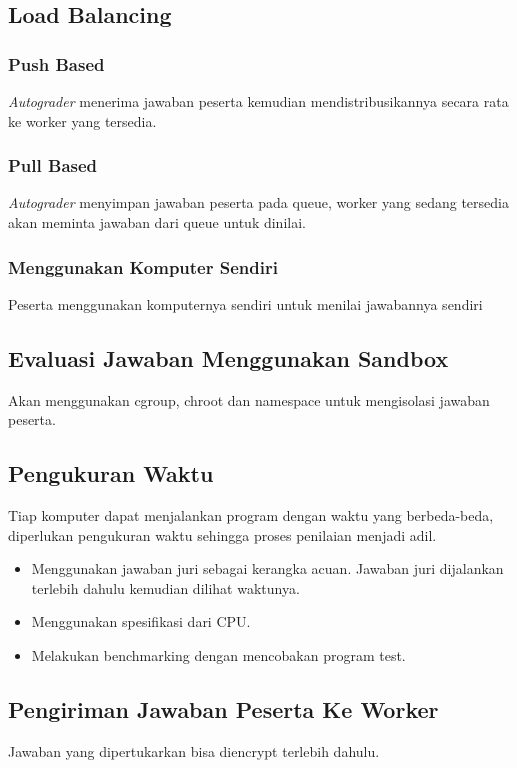 \subsection{Load Balancing}

\subsubsection{Push Based}

\par \textit{Autograder} menerima jawaban peserta kemudian mendistribusikannya secara rata ke worker yang tersedia.

\subsubsection{Pull Based}

\par \textit{Autograder} menyimpan jawaban peserta pada queue, worker yang sedang tersedia akan meminta jawaban dari queue untuk dinilai.

\subsubsection{Menggunakan Komputer Sendiri}

\par Peserta menggunakan komputernya sendiri untuk menilai jawabannya sendiri

\subsection{Evaluasi Jawaban Menggunakan Sandbox}

\par Akan menggunakan cgroup, chroot dan namespace untuk mengisolasi jawaban peserta.

\subsection{Pengukuran Waktu}

\par Tiap komputer dapat menjalankan program dengan waktu yang berbeda-beda, diperlukan pengukuran waktu sehingga proses penilaian menjadi adil.

\begin{itemize}
    \item Menggunakan jawaban juri sebagai kerangka acuan. Jawaban juri dijalankan terlebih dahulu kemudian dilihat waktunya.
    \item Menggunakan spesifikasi dari CPU.
    \item Melakukan benchmarking dengan mencobakan program test.
\end{itemize}

\subsection{Pengiriman Jawaban Peserta Ke Worker}

\par Jawaban yang dipertukarkan bisa diencrypt terlebih dahulu.
